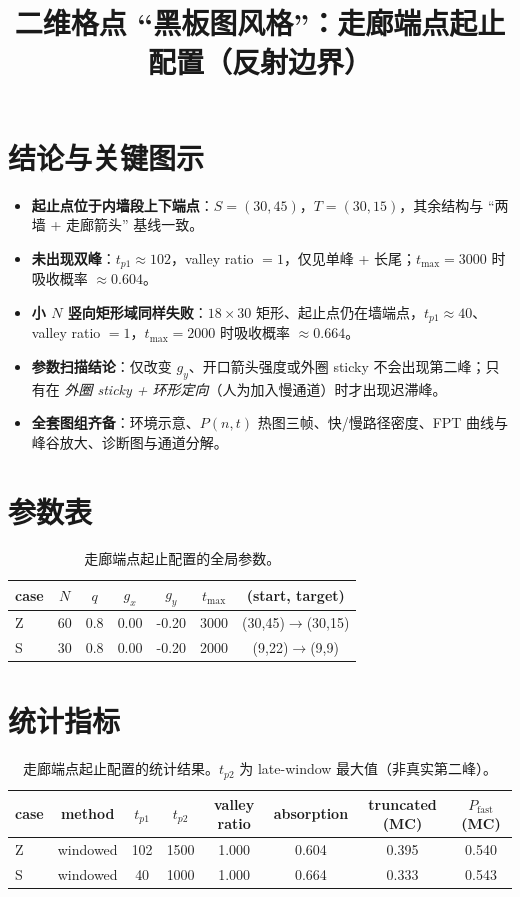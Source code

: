 \documentclass[11pt,fontset=fandol]{ctexart}
\title{二维格点 ``黑板图风格''：走廊端点起止配置（反射边界）}
\author{}
\date{}
\begin{document}
\sloppy
\maketitle

\section*{结论与关键图示}
\begin{itemize}
  \item \textbf{起止点位于内墙段上下端点}：$S=(30,45)$，$T=(30,15)$，其余结构与 ``两墙 + 走廊箭头'' 基线一致。
  \item \textbf{未出现双峰}：$t_{p1}\approx102$，valley ratio $=1$，仅见单峰 + 长尾；$t_{\max}=3000$ 时吸收概率 $\approx0.604$。
  \item \textbf{小 $N$ 竖向矩形域同样失败}：$18\times30$ 矩形、起止点仍在墙端点，$t_{p1}\approx40$、valley ratio $=1$，$t_{\max}=2000$ 时吸收概率 $\approx0.664$。
  \item \textbf{参数扫描结论}：仅改变 $g_y$、开口箭头强度或外圈 sticky 不会出现第二峰；只有在 \emph{外圈 sticky + 环形定向}（人为加入慢通道）时才出现迟滞峰。
  \item \textbf{全套图组齐备}：环境示意、$P(n,t)$ 热图三帧、快/慢路径密度、FPT 曲线与峰谷放大、诊断图与通道分解。
\end{itemize}

\section*{参数表}
\begin{table}[!htbp]
  \centering
  \begin{tabular}{lcccccc}
    \toprule
    case & $N$ & $q$ & $g_x$ & $g_y$ & $t_{\max}$ & (start, target) \\
    \midrule
    Z & 60 & 0.8 & 0.00 & -0.20 & 3000 & (30,45)$\to$(30,15) \\
    S & 30 & 0.8 & 0.00 & -0.20 & 2000 & (9,22)$\to$(9,9) \\
    \bottomrule
  \end{tabular}
  \caption{走廊端点起止配置的全局参数。}
  \label{tab:params}
\end{table}

\section*{统计指标}
\begin{table}[!htbp]
  \centering
  \scriptsize
  \begin{tabular}{lccccccc}
    \toprule
    case & method & $t_{p1}$ & $t_{p2}$ & valley ratio & absorption & truncated (MC) & $P_{\text{fast}}$ (MC) \\
    \midrule
    Z & windowed & 102 & 1500 & 1.000 & 0.604 & 0.395 & 0.540 \\
    S & windowed & 40 & 1000 & 1.000 & 0.664 & 0.333 & 0.543 \\
    \bottomrule
  \end{tabular}
  \caption{走廊端点起止配置的统计结果。$t_{p2}$ 为 late-window 最大值（非真实第二峰）。}
  \label{tab:metrics}
\end{table}
\end{document}
